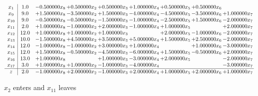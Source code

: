 \documentclass[10pt]{article}
\begin{document}
 \[\begin{array}{c| c c@{\hskip 2pt} c@{\hskip 2pt} c@{\hskip 2pt} c@{\hskip 2pt} c@{\hskip 2pt} c@{\hskip 2pt} c@{\hskip 2pt} }
 x_{1}   &  1.0 & -0.500000 x_{8} & + 0.500000 x_{2} & + 0.500000 x_{3} & + 1.000000 x_{4} & + 0.500000 x_{5} & + 0.500000 x_{6} &   \\
 x_{9}   &  9.0 & + 1.500000 x_{8} & -3.500000 x_{2} & + 1.500000 x_{3} & -4.000000 x_{4} & -4.500000 x_{5} & -3.500000 x_{6} & + 1.000000 x_{7}\\
 x_{10}   &  9.0 & -0.500000 x_{8} & -0.500000 x_{2} & -1.500000 x_{3} & -1.000000 x_{4} & -2.500000 x_{5} & + 1.500000 x_{6} & -2.000000 x_{7}\\
 x_{11}   &  2.0 & + 1.000000 x_{8} & -1.000000 x_{2} & + 2.000000 x_{3} & -1.000000 x_{4} & + 1.000000 x_{5} &   & + 2.000000 x_{7}\\
 x_{12}   &  12.0 & + 1.000000 x_{8} & + 1.000000 x_{2} & + 1.000000 x_{3} &   & + 2.000000 x_{5} & -1.000000 x_{6} & -2.000000 x_{7}\\
 x_{13}   &  10.0 & -1.500000 x_{8} & + 4.500000 x_{2} & + 3.500000 x_{3} & + 5.000000 x_{4} & + 1.500000 x_{5} & + 2.500000 x_{6} & -2.000000 x_{7}\\
 x_{14}   &  12.0 & -1.000000 x_{8} & -1.000000 x_{2} & + 3.000000 x_{3} & + 1.000000 x_{4} &   & + 1.000000 x_{6} & -3.000000 x_{7}\\
 x_{15}   &  12.0 & + 1.500000 x_{8} & -0.500000 x_{2} & -4.500000 x_{3} & -6.000000 x_{4} & + 1.500000 x_{5} & -0.500000 x_{6} & + 2.000000 x_{7}\\
 x_{16}   &  13.0 & + 1.000000 x_{8} &   & + 1.000000 x_{3} & -3.000000 x_{4} & + 2.000000 x_{5} &   & -2.000000 x_{7}\\
 x_{17}   &  3.0 & + 1.000000 x_{8} & + 1.000000 x_{2} & -1.000000 x_{3} & -4.000000 x_{4} &    &   & -3.000000 x_{7}\\
\hline
z    &  2.0 & -1.000000 x_{8} & + 2.000000 x_{2} & -1.000000 x_{3} & + 2.000000 x_{4} & + 1.000000 x_{5} & + 2.000000 x_{6} & + 1.000000 x_{7}\\
\end{array}\]


 $ x_{2} $ enters and $ x_{11} $ leaves 
\end{document}
